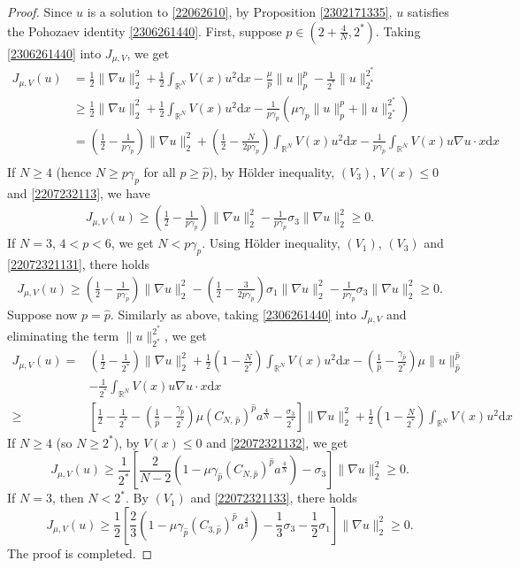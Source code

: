 \documentclass[10pt]{article}
\numberwithin{equation}{section}
\newcommand{\ud}{\mathrm{d}}
\numberwithin{equation}{section}
\begin{document}
\begin{proof}
Since $u$ is a solution to \eqref{22062610}, by Proposition \ref{2302171335}, $u$ satisfies the Pohozaev identity \eqref{2306261440}.
First, suppose $p\in (2+\frac{4}{N}, 2^*)$. Taking \eqref{2306261440} into $J_{\mu, V}$, we get
\[
\begin{aligned}
J_{\mu, V}(u)&=\frac12 \|\nabla u\|_2^2+\frac12 \int_{\mathbb{R}^N} V(x)u^2 \ud x-\frac{\mu}{p} \|u\|_p^p-\frac{1}{2^*}\|u\|_{2^*}^{2^*}\\
&\ge \frac12 \|\nabla u\|_2^2+\frac12 \int_{\mathbb{R}^N} V(x)u^2 \ud x-\frac{1}{p\gamma_p}\left(\mu \gamma_p \|u\|_p^p+\|u\|_{2^*}^{2^*}\right)\\
&= \left(\frac12-\frac{1}{p\gamma_p}\right) \|\nabla u\|_2^2+\left(\frac12-\frac{N}{2p\gamma_p}\right) \int_{\mathbb{R}^N} V(x)u^2 \ud x-\frac{1}{p\gamma_p}\int_{\mathbb{R}^N} V(x)u\nabla u\cdot x \ud x \\
\end{aligned}
\]
If $N\ge 4$ (hence $N\ge p\gamma_p$ for all $p \geq \hat p$), by H\"{o}lder inequality, $(V_3)$, $V(x)\le 0$ and \eqref{2207232113}, we have
\[
\begin{aligned}
J_{\mu, V}(u)\ge \left(\frac12-\frac{1}{p\gamma_p}\right) \|\nabla u\|_2^2-\frac{1}{p\gamma_p} {\sigma_3}\|\nabla u\|^2_2 \ge 0.
\end{aligned}
\]
If $N=3$, $4<p<6$,  we get $N< p\gamma_p$. Using H\"{o}lder inequality, $(V_1)$, $(V_3)$ and \eqref{22072321131}, there holds
\[
\begin{aligned}
J_{\mu, V}(u)\ge \left(\frac12-\frac{1}{p\gamma_p}\right) \|\nabla u\|_2^2-\left(\frac12-\frac{3}{2p\gamma_p}\right) \sigma_1\|\nabla u\|_{2}^2-\frac{1}{p\gamma_p} {\sigma_3}\|\nabla u\|^2_2 \ge 0.
\end{aligned}
\]
Suppose now $p=\hat{p}$. Similarly as above, taking \eqref{2306261440} into $J_{\mu, V}$ and eliminating the term $\|u\|_{2^*}^{2^*}$, we get
\[
\begin{aligned}
J_{\mu, V}(u)= &\left( \frac12- \frac1{2^*}\right)\|\nabla u\|_2^2+\frac12\left(1 - \frac{N}{2^*}\right)\int_{\mathbb{R}^N} V(x)u^2 \ud x-\left(\frac{1}{{\hat{p}}} -\frac{\gamma_{\hat{p}}}{2^*}\right)\mu\|u\|_{\hat{p}}^{\hat{p}}\\
&-\frac1{2^*}\int_{\mathbb{R}^N} V(x)u\nabla u\cdot x \ud x \\
\ge& \left[\frac12- \frac1{2^*}-\left(\frac{1}{{\hat{p}}} -\frac{\gamma_{\hat{p}}}{2^*}\right)\mu (C_{N,\, {\hat{p}}})^{{\hat{p}}}a^{\frac4N}-\frac{{\sigma_3}}{2^*}\right]\|\nabla u\|_2^2+\frac12\left(1 - \frac{N}{2^*}\right)\int_{\mathbb{R}^N} V(x)u^2 \ud x
\end{aligned}
\]
If $N\ge 4$ (so $N\ge 2^*$), by $V(x)\le 0$ and \eqref{22072321132}, we get
\[
J_{\mu, V}(u)\ge \frac1{2^*}\left[ \frac2{N-2}\left(1-\mu \gamma_{\hat{p}}(C_{N, {\hat{p}}})^{{\hat{p}}}a^{\frac4N}\right)- \sigma_3\right]\|\nabla u\|_2^2\ge 0.
\]
If $N=3$, then $N<2^*$. By $(V_1)$ and \eqref{22072321133}, there holds
\[
J_{\mu, V}(u)\ge \frac12\left[ \frac2{3}\left(1-\mu \gamma_{\hat{p}}(C_{3, \hat{p}})^{\hat{p}} a^{\frac43}\right) -\frac{1}{3}{\sigma_3}- \frac{1}{2}\sigma_1\right]\|\nabla u\|_2^2\ge 0.
\]
The proof is completed.
\end{proof}
\end{document}
